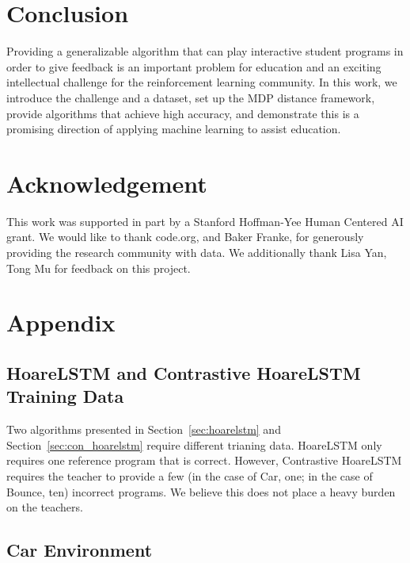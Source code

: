 \documentclass{article}
\begin{document}
\section{Conclusion}
Providing a generalizable algorithm that can play interactive student programs in order to give feedback is an important problem for education and an exciting intellectual challenge for the reinforcement learning community. In this work, we introduce the challenge and a dataset, set up the MDP distance framework, provide algorithms that achieve high accuracy, and demonstrate this is a promising direction of applying machine learning to assist education.

\section*{Acknowledgement} 
This work was supported in part by a Stanford Hoffman-Yee Human Centered AI grant. We would like to thank code.org, and Baker Franke, for generously providing the research community with data. We additionally thank Lisa Yan, Tong Mu for feedback on this project.









\clearpage

\appendix

\section{Appendix}


\subsection{HoareLSTM and Contrastive HoareLSTM Training Data}

Two algorithms presented in Section~\ref{sec:hoarelstm} and Section~\ref{sec:con_hoarelstm} require different trianing data. HoareLSTM only requires one reference program that is correct. However, Contrastive HoareLSTM requires the teacher to provide a few (in the case of Car, one; in the case of Bounce, ten) incorrect programs. We believe this does not place a heavy burden on the teachers.

\subsection{Car Environment}
\end{document}

